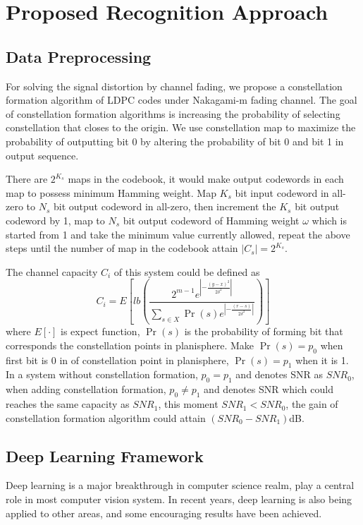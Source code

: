 \documentclass[conference]{IEEEtran}
\begin{document}
\section{Proposed Recognition Approach}

\subsection{Data Preprocessing}
For solving the signal distortion by channel fading, we propose a constellation formation algorithm of LDPC codes under Nakagami-m fading channel. The goal of constellation formation algorithms is increasing the probability of selecting constellation that closes to the origin. We use constellation map to maximize the probability of outputting bit 0 by altering the probability of bit 0 and bit 1 in output sequence.

There are $2^{K_s}$ maps in the codebook, it would make output codewords in each map to possess minimum Hamming weight. Map $K_s$ bit input codeword in all-zero to $N_s$ bit output codeword in all-zero, then increment the $K_s$ bit output codeword by 1, map to $N_s$ bit output codeword of Hamming weight $\omega$ which is started from 1 and take the minimum value currently allowed, repeat the above steps until the number of map in the codebook attain $|{C}_{s}|=2^{{K}_{s}}$.

The channel capacity $C_i$ of this system could be defined as
\begin{equation}
	C_{i} = E\left[l b\left(\frac{2^{m-1} e^{\left|-\frac{(y-x)^{2}}{2 \delta^{2}}\right|}}{\sum_{s \in X} \operatorname{Pr}(s) e^{\left|-\frac{(r-s)}{2 \delta^{2}}\right|}}\right)\right]
\end{equation}
where ${E}[\cdot]$ is expect function, $\operatorname{Pr}(s)$ is the probability of forming bit that corresponds the constellation points in planisphere. Make $\operatorname{Pr}(s) = p_0$ when first bit is 0 in of constellation point in planisphere, $\operatorname{Pr}(s) = p_1$ when it is 1. In a system without constellation formation, $p_0 = p_1$ and denotes SNR as $SNR_0$, when adding constellation formation, ${p}_{0} \neq {p}_{1}$ and denotes SNR which could reaches the same capacity as $SNR_1$, this moment $SNR_1 < SNR_0$, the gain of constellation formation algorithm could attain $(SNR_0 - SNR_1)$dB.

\subsection{Deep Learning Framework}
Deep learning is a major breakthrough in computer science realm, play a central role in most computer vision system. In recent years, deep learning is also being applied to other areas, and some encouraging results have been achieved. 
\end{document}
